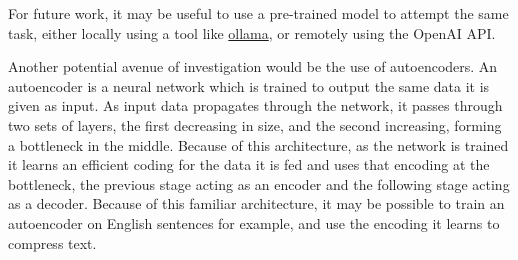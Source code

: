 For future work, it may be useful to use a pre-trained model to attempt the same task, either locally using a tool like \href{https://ollama.com/}{ollama}, or remotely using the OpenAI API.

Another potential avenue of investigation would be the use of autoencoders. An autoencoder is a neural network which is trained to output the same data it is given as input. As input data propagates through the network, it passes through two sets of layers, the first decreasing in size, and the second increasing, forming a bottleneck in the middle. Because of this architecture, as the network is trained it learns an efficient coding for the data it is fed and uses that encoding at the bottleneck, the previous stage acting as an encoder and the following stage acting as a decoder. Because of this familiar architecture, it may be possible to train an autoencoder on English sentences for example, and use the encoding it learns to compress text.